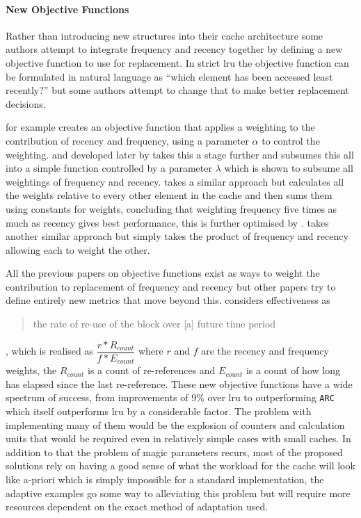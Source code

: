 \paragraph{New Objective Functions}

Rather than introducing new structures into their cache architecture some authors attempt to integrate frequency and recency together by defining a new objective function to use for replacement. In strict \gls{lru} the objective function can be formulated in natural language as ``which element has been accessed least recently?'' but some authors attempt to change that to make better replacement decisions.

\citet{reddyIntelligentWebCaching1998} for example creates an objective function that applies a weighting to the contribution of recency and frequency, using a parameter $\alpha$ to control the weighting. \citeauthor{dongheeleeImplementationPerformanceEvaluation1997} \cite{dongheeleeLRFUSpectrumPolicies2001} and developed later by \citet{cuiNewHybridApproach2003} takes this a stage further and subsumes this all into a simple function controlled by a parameter $\lambda$ which is shown to subsume all weightings of frequency and recency. \citet{abdelfattahLeastRecentlyFive2012} takes a similar approach but calculates all the weights relative to every other element in the cache and then sums them using constants for weights, concluding that weighting frequency five times as much as recency gives best performance, this is further optimised by \citet{anandkumarHybridCacheReplacement2014}. \citet{dasArbitrationCacheReplacements2016} takes another similar approach but simply takes the product of frequency and recency allowing each to weight the other.

All the previous papers on objective functions exist as ways to weight the contribution to replacement of frequency and recency but other papers try to define entirely new metrics that move beyond this. \citet{tianEffectivenessbasedAdaptiveCache2014} considers effectiveness as \blockcquote{tianEffectivenessbasedAdaptiveCache2014}{the rate of re-use of the block over [a] future time period}, which is realised as $\dfrac{r*R_{count}}{f*E_{count}}$ where $r$ and $f$ are the recency and frequency weights, the $R_{count}$ is a count of re-references and $E_{count}$ is a count of how long has elapsed since the last re-reference. These new objective functions have a wide spectrum of success, from improvements of 9\% over \gls{lru} to outperforming \texttt{ARC} which itself outperforms \gls{lru} by a considerable factor. The problem with implementing many of them would be the explosion of counters and calculation units that would be required even in relatively simple cases with small caches. In addition to that the problem of magic parameters recurs, most of the proposed solutions rely on having a good sense of what the workload for the cache will look like a-priori which is simply impossible for a standard implementation, the adaptive examples go some way to alleviating this problem but will require more resources dependent on the exact method of adaptation used.

